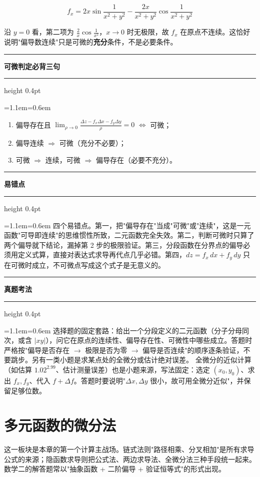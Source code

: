 \documentclass[11pt,openany,UTF8]{ctexbook}
\newcommand{\callouthead}[2]{%
  \par\addvspace{7pt}\noindent
  {\color{#1}\rule[-0.15em]{3pt}{1.05em}}\hspace{0.5em}%
  {\bfseries\color{#1}#2}\par\nobreak\vspace{-0.35em}%
  {\color{rulesep}\hrule height 0.4pt}\nobreak\vspace{0.45em}%
  \begingroup\small\setlength{\parindent}{0pt}%
  \leftskip=1.1em\rightskip=0.6em\noindent\ignorespaces}
\newcommand{\calloutend}{\par\endgroup\addvspace{7pt}}
\newenvironment{callkey}[1]{\callouthead{keybar}{#1}}{\calloutend}
\newenvironment{callwarn}[1]{\callouthead{warnbar}{#1}}{\calloutend}
\newenvironment{callexam}[1]{\callouthead{exambar}{#1}}{\calloutend}
\begin{document}
\[f_x=2x\sin\frac{1}{x^{2}+y^{2}}-\frac{2x}{x^{2}+y^{2}}\cos\frac{1}{x^{2}+y^{2}}\]

沿 $y=0$ 看，第二项为 $\frac{2}{x}\cos\frac{1}{x^{2}}$，$x\to 0$ 时无极限，故 $f_x$ 在原点不连续。这恰好说明"偏导数连续"只是可微的\textbf{充分}条件，不是必要条件。

\begin{callkey}{可微判定必背三句}
\begin{enumerate}
\item 偏导存在且 $\lim_{\rho\to 0}\frac{\Delta z-f_x\Delta x-f_y\Delta y}{\rho}=0$ $\iff$ 可微；
\item 偏导连续 $\Rightarrow$ 可微（充分不必要）；
\item 可微 $\Rightarrow$ 连续，可微 $\Rightarrow$ 偏导存在（必要不充分）。
\end{enumerate}
\end{callkey}

\begin{callwarn}{易错点}
四个易错点。第一，把"偏导存在"当成"可微"或"连续"，这是一元函数"可导即连续"的思维惯性所致，二元函数完全失效。第二，判断可微时只算了两个偏导就下结论，漏掉第 2 步的极限验证。第三，分段函数在分界点的偏导必须用定义式算，直接对表达式求导再代点几乎必错。第四，$dz=f_x\,dx+f_y\,dy$ 只在可微时成立，不可微点写成这个式子是无意义的。

\end{callwarn}

\begin{callexam}{真题考法}
选择题的固定套路：给出一个分段定义的二元函数（分子分母同次，或含 $\vert xy\vert$），问它在原点的连续性、偏导存在性、可微性中哪些成立。答题时严格按"偏导是否存在 $\to$ 极限是否为零 $\to$ 偏导是否连续"的顺序逐条验证，不要跳步。另有一类小题是求某点处的全微分或估计绝对误差。 全微分的近似计算（如估算 $1.02^{2.99}$、估计测量误差）也是小题来源，写法固定：选定 $(x_0,y_0)$、求出 $f_x,f_y$、代入 $f+\Delta f$。答题时要说明"$\Delta x,\Delta y$ 很小，故可用全微分近似"，并保留足够位数。

\end{callexam}

\section{多元函数的微分法}

这一板块是本章的第一个计算主战场。链式法则"路径相乘、分叉相加"是所有求导公式的来源；隐函数求导则把公式法、两边求导法、全微分法三种手段统一起来。数学二的解答题常以"抽象函数 + 二阶偏导 + 验证恒等式"的形式出现。
\end{document}
